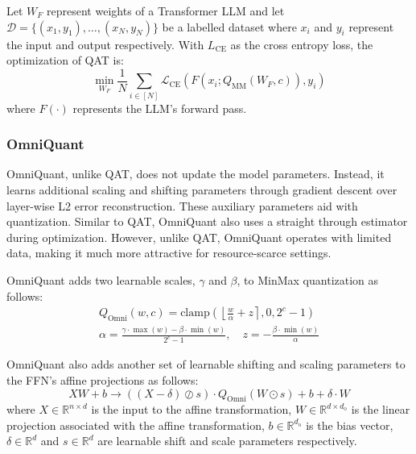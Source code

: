 Let $W_F$ represent weights of a Transformer LLM and let $\mathcal{D}=\{(x_1, y_1), \ldots, (x_N,y_N)\}$ be a labelled dataset where $x_i$ and $y_i$ represent the input and output respectively. With $L_{\text{CE}}$ as the cross entropy loss, the optimization of QAT is:
\begin{equation}
    \min_{W_F} \frac{1}{N}\sum_{i\in [N]}\mathcal{L}_{\text{CE}}\left( F(x_i;Q_{\text{MM}}\left(W_F, c\right)), y_i\right)
\end{equation}
where $F(\cdot)$ represents the LLM's forward pass.

\subsubsection{OmniQuant}
OmniQuant, unlike QAT, does not update the model parameters. Instead, it learns additional scaling and shifting parameters through gradient descent over layer-wise L2 error reconstruction. These auxiliary parameters aid with quantization. Similar to QAT, OmniQuant also uses a straight through estimator during optimization. However, unlike QAT, OmniQuant operates with limited data, making it much more attractive for resource-scarce settings.

OmniQuant adds two learnable scales, $\gamma$ and $\beta$, to MinMax quantization as follows:
\begin{equation}
\label{eqn:omni_quant}
\begin{aligned}
Q_{\text{Omni}}(w, c) = \text{clamp}\left(\left\lfloor \frac{w}{\alpha} + z\right\rceil, 0, 2^c-1\right) \\
    \alpha = \frac{\gamma\cdot\max(w) -\beta\cdot \min(w)}{2^c-1}, \quad
    z = -\frac{\beta\cdot\min(w)}{\alpha}
\end{aligned}
\end{equation}

OmniQuant also adds another set of learnable shifting and scaling parameters to the FFN's affine projections as follows:
\begin{equation}
    \label{eqn:omni_ffn}
    XW + b \rightarrow \left((X - \delta)\oslash s\right)\cdot Q_{\text{Omni}}(W \odot s) + b + \delta \cdot W
\end{equation}
where $X \in \mathbb{R}^{n \times d}$ is the input to the affine transformation, $W \in \mathbb{R}^{d \times d_{\text{o}}}$ is the linear projection associated with the affine transformation, $b \in \mathbb{R}^{d_{\text{o}}}$ is the bias vector, $\delta \in \mathbb{R}^d$ and $s \in \mathbb{R}^d$ are learnable shift and scale parameters respectively.

